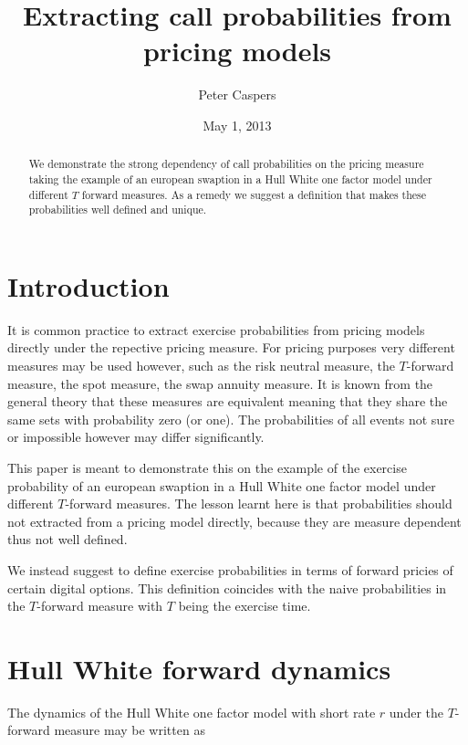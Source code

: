 \documentclass{amsart}
\theoremstyle{plain}
\numberwithin{equation}{section}
\begin{document}
\title[Call Probabilities]{Extracting call probabilities from pricing models}
\author{Peter Caspers}
\date{May 1, 2013}
\begin{abstract}
We demonstrate the strong dependency of call probabilities on the pricing measure taking the example
of an european swaption in a Hull White one factor model under different $T$ forward measures. As a remedy we suggest a definition
that makes these probabilities well defined and unique.
\end{abstract}
\maketitle

\section{Introduction}

It is common practice to extract exercise probabilities from pricing models directly under the repective pricing measure. For pricing purposes
very different measures may be used however, such as the risk neutral measure, the $T$-forward measure,
the spot measure, the swap annuity measure. It is known from the general theory that these measures are equivalent
meaning that they share the same sets with probability zero (or one). The probabilities of all events not sure or impossible
however may differ significantly.

This paper is meant to demonstrate this on the example of the exercise probability of an european swaption in a Hull
White one factor model under different $T$-forward measures. The lesson learnt here is that probabilities should not extracted from a pricing model directly,
because they are measure dependent thus not well defined.

We instead suggest to define exercise probabilities in terms of forward pricies of certain digital options. This definition
coincides with the naive probabilities in the $T$-forward measure with $T$ being the exercise time.

\section{Hull White forward dynamics}

The dynamics of the Hull White one factor model with short rate $r$ under the $T$-forward measure may be written as 
\end{document}
